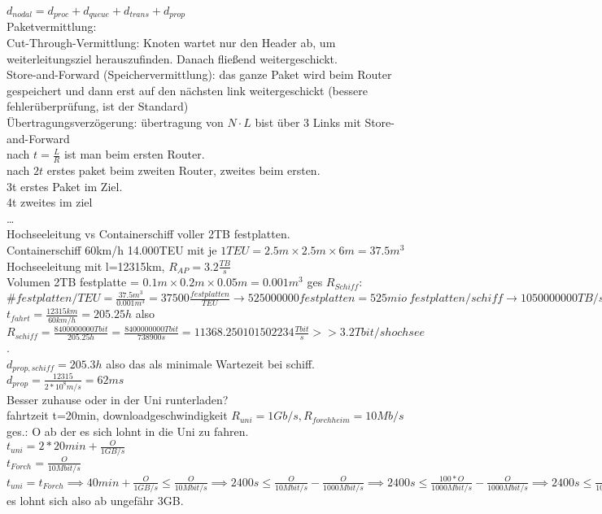 \documentclass{article}
\begin{document}
	$d_{nodal} = d_{proc}+d_{queue}+d_{trans}+d_{prop}$\\
	Paketvermittlung:\\
	Cut-Through-Vermittlung: Knoten wartet nur den Header ab, um weiterleitungsziel herauszufinden. Danach fließend weitergeschickt.\\
	Store-and-Forward (Speichervermittlung): das ganze Paket wird beim Router gespeichert und dann erst auf den nächsten link weitergeschickt (bessere fehlerüberprüfung, ist der Standard)\\
	Übertragungsverzögerung: übertragung von $N\cdot L$ bist über 3 Links mit Store-and-Forward\\
	nach $t=\frac{L}{R}$ ist man beim ersten Router.\\
	nach $2t$ erstes paket beim zweiten Router, zweites beim ersten.\\
	3t erstes Paket im Ziel.\\
	4t zweites im ziel\\
	\dots\\
	Hochseeleitung vs Containerschiff voller 2TB festplatten.\\
	Containerschiff 60km/h 14.000TEU mit je $1TEU =2.5m\times 2.5m\times 6m = 37.5m^3$ \\
	Hochseeleitung mit l=12315km, $R_{AP}=3.2\frac{TB}{s}$\\
	Volumen 2TB festplatte = $0.1m\times0.2m\times0.05m = 0.001m^3$
	ges $R_{Schiff}$:\\
	$\#festplatten/TEU = \frac{37.5m^3}{0.001m^3}=37500\frac{festplatten}{TEU}\to 525000000festplatten=525mio\ festplatten/schiff\to 1050000000TB/schiff \to 8400000000Tbit/schiff$\\
	$t_{fahrt} = \frac{12315km}{60km/h} = 205.25h$ also $R_{schiff}=\frac{8400000000Tbit}{205.25h} = \frac{8400000000Tbit}{738900s}= 11368.250101502234\frac{Tbit}{s}>>3.2Tbit/s hochsee$.\\
	$d_{prop,schiff}=205.3h$ also das als minimale Wartezeit bei schiff.\\
	$d_{prop} = \frac{12315}{2*10^8m/s} = 62ms$\\
	Besser zuhause oder in der Uni runterladen?\\
	fahrtzeit t=20min, downloadgeschwindigkeit $R_{uni}=1Gb/s, R_{forchheim} = 10Mb/s$\\
	ges.: O ab der es sich lohnt in die Uni zu fahren.\\
	$t_{uni} = 2*20min +\frac{O}{1GB/s}$\\
	$t_{Forch} = \frac{O}{10Mbit/s}$\\
	$t_{uni} = t_{Forch} \implies 40min +\frac{O}{1GB/s}\leq  \frac{O}{10Mbit/s}\implies 2400s \leq  \frac{O}{10Mbit/s}-\frac{O}{1000Mbit/s}\implies 2400s \leq  \frac{100*O}{1000Mbit/s}-\frac{O}{1000Mbit/s}\implies 2400s \leq  \frac{99*O}{1000Mbit/s}\implies \frac{2400s\cdot 1Gbit/s}{99} \leq  O\implies 24.24Gbit \leq O\implies 3 GB \leq  O$ es lohnt sich also ab ungefähr 3GB.\\
	
\end{document}
